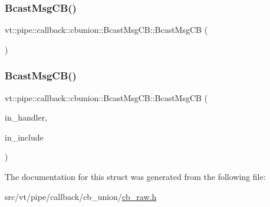 \subsubsection{\texorpdfstring{Bcast\+Msg\+C\+B()}{BcastMsgCB()}\hspace{0.1cm}{\footnotesize\ttfamily [1/2]}}
{\footnotesize\ttfamily vt\+::pipe\+::callback\+::cbunion\+::\+Bcast\+Msg\+C\+B\+::\+Bcast\+Msg\+CB (\begin{DoxyParamCaption}{ }\end{DoxyParamCaption})\hspace{0.3cm}{\ttfamily [default]}}

\mbox{\label{structvt_1_1pipe_1_1callback_1_1cbunion_1_1_bcast_msg_c_b_a513cd5976cb7fc18d658f71d3fd0a107}} 
\subsubsection{\texorpdfstring{Bcast\+Msg\+C\+B()}{BcastMsgCB()}\hspace{0.1cm}{\footnotesize\ttfamily [2/2]}}
{\footnotesize\ttfamily vt\+::pipe\+::callback\+::cbunion\+::\+Bcast\+Msg\+C\+B\+::\+Bcast\+Msg\+CB (\begin{DoxyParamCaption}\item[{\hyperlink{namespacevt_af64846b57dfcaf104da3ef6967917573}{Handler\+Type} const}]{in\+\_\+handler,  }\item[{bool const \&}]{in\+\_\+include }\end{DoxyParamCaption})\hspace{0.3cm}{\ttfamily [inline]}}



The documentation for this struct was generated from the following file\+:\begin{DoxyCompactItemize}
\item 
src/vt/pipe/callback/cb\+\_\+union/\hyperlink{cb__raw_8h}{cb\+\_\+raw.\+h}\end{DoxyCompactItemize}
